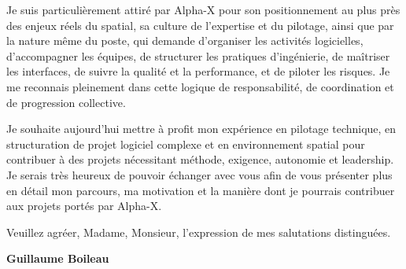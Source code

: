 \documentclass[11pt,a4paper]{../_shared/altacv}
\begin{document}
{Je suis particulièrement attiré par Alpha-X pour son positionnement au plus près des enjeux réels du spatial, sa culture de l'expertise et du pilotage, ainsi que par la nature même du poste, qui demande d'organiser les activités logicielles, d'accompagner les équipes, de structurer les pratiques d'ingénierie, de maîtriser les interfaces, de suivre la qualité et la performance, et de piloter les risques. Je me reconnais pleinement dans cette logique de responsabilité, de coordination et de progression collective.

Je souhaite aujourd'hui mettre à profit mon expérience en pilotage technique, en structuration de projet logiciel complexe et en environnement spatial pour contribuer à des projets nécessitant méthode, exigence, autonomie et leadership. Je serais très heureux de pouvoir échanger avec vous afin de vous présenter plus en détail mon parcours, ma motivation et la manière dont je pourrais contribuer aux projets portés par Alpha-X.

Veuillez agréer, Madame, Monsieur, l'expression de mes salutations distinguées.

\textbf{Guillaume Boileau}

}
\end{document}
